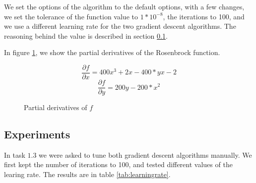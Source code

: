 \documentclass{article}
\begin{document}
We set the options of the algorithm to the default options, with a few changes, we set the tolerance of the function value to $1*10^{-8}$, the iterations to 100, and we use a different learning rate for the two gradient descent algorithms. The reasoning behind the value is described in section \ref{sec:experiments}.

In figure \ref{fig:partdiv}, we show the partial derivatives of the Rosenbrock function.
\begin{figure}[H]
    \[\frac{\partial f}{\partial x} = 400x^3 + 2x - 400*yx - 2\]
    \[\frac{\partial f}{\partial y} = 200y - 200*x^2\]
    \caption{Partial derivatives of $f$}
    \label{fig:partdiv}
\end{figure}



\subsection{Experiments}
\label{sec:experiments}
In task $1.3$ we were asked to tune both gradient descent algorithms manually. We first kept the number of iterations to 100, and tested different values of the learing rate. The results are in table \ref{tab:learningrate}.
\end{document}
